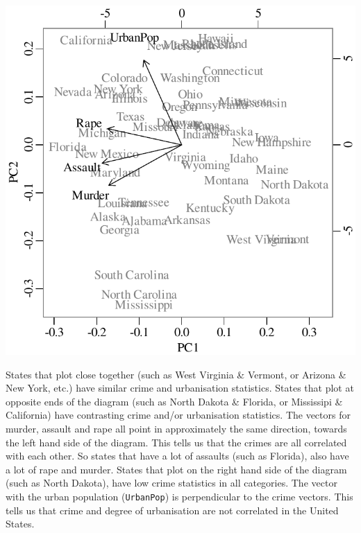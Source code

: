 \noindent\begin{minipage}[t][][b]{.5\textwidth}
  \includegraphics[width=\textwidth]{../figures/USArrests.pdf}\medskip
\end{minipage}
\begin{minipage}[t][][t]{.5\textwidth}
  \label{fig:USArrests}
\end{minipage}

States that plot close together (such as West Virginia \& Vermont, or
Arizona \& New York, etc.)  have similar crime and urbanisation
statistics.  States that plot at opposite ends of the diagram (such as
North Dakota \& Florida, or Mississipi \& California) have contrasting
crime and/or urbanisation statistics.  The vectors for murder, assault
and rape all point in approximately the same direction, towards the
left hand side of the diagram. This tells us that the crimes are all
correlated with each other. So states that have a lot of assaults
(such as Florida), also have a lot of rape and murder. States that
plot on the right hand side of the diagram (such as North Dakota),
have low crime statistics in all categories.  The vector with the
urban population (\texttt{UrbanPop}) is perpendicular to the crime
vectors. This tells us that crime and degree of urbanisation are not
correlated in the United States.

